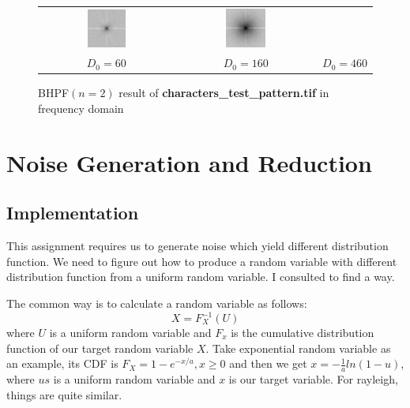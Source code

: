 \documentclass[11pt,a4paper]{article}
\begin{document}
\begin{figure}[!htbp]
\begin{tabular}{ccc}
		\includegraphics[width=0.3\textwidth]{pro3/BHPF/BHPF_160_spectrum}&
		\includegraphics[width=0.3\textwidth]{pro3/BHPF/BHPF_460_spectrum} \\
		 $D_0=60$ &  $D_0=160$ &  $D_0=460$
	\end{tabular}
	\caption{BHPF$(n=2)$ result of \textbf{characters\_test\_pattern.tif} in frequency domain}
	\label{pro3_fig6}
\end{figure}

\section{Noise Generation and Reduction}
\subsection{Implementation}
This assignment requires us to generate noise which yield different distribution 
function. We need to figure out how to produce a random variable with different
distribution function from a uniform random variable. I consulted \cite{randomv}
to find a way.

The common way is to calculate a random variable as follows:
\begin{equation}
	X=F_X^{-1}(U)
\end{equation}
where $U$ is a uniform random variable and $F_x$ is the cumulative distribution 
function of our target random variable $X$. Take exponential random variable as 
an example, its CDF is $F_X=1-e^{-x/a},x\geq 0$ and then we get $x=-\frac{1}{a}ln(1-u)$,
where $us$ is a uniform random variable and $x$ is our target variable.
For rayleigh, things are quite similar. 
\end{document}
